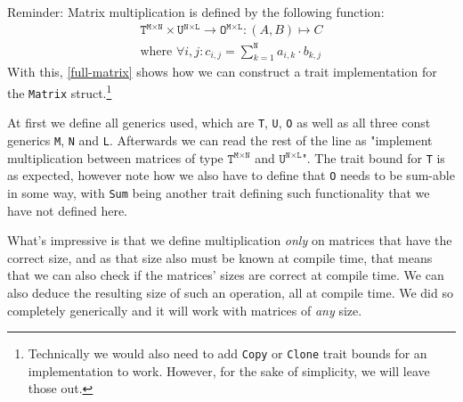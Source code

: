 Reminder: Matrix multiplication is defined by the following function:
\begin{align*}
\texttt{T}^{\texttt{M} \times \texttt{N}} \times \texttt{U}^{\texttt{N} \times \texttt{L}} \to \texttt{O}^{\texttt{M} \times \texttt{L}} : (A, B) \mapsto C \\
\text{where } \forall i, j: c_{i, j} = \sum_{k = 1}^{\texttt{N}} a_{i, k} \cdot b_{k, j}
\end{align*}
With this, \autoref{full-matrix} shows how we can construct a trait implementation for the \verb|Matrix| struct.\footnote{Technically we would also need to add \verb|Copy| or \verb|Clone| trait bounds for an implementation to work. However, for the sake of simplicity, we will leave those out.}

At first we define all generics used, which are \verb|T|, \verb|U|, \verb|O| as well as all three const generics \verb|M|, \verb|N| and \verb|L|.
Afterwards we can read the rest of the line as "implement multiplication between matrices of type $\texttt{T}^{\texttt{M} \times \texttt{N}}$ and $\texttt{U}^{\texttt{N} \times \texttt{L}}$". The trait bound for \verb|T| is as expected, however note how we also have to define that \verb|O| needs to be sum-able in some way, with \verb|Sum| being another trait defining such functionality that we have not defined here.

What's impressive is that we define multiplication \emph{only} on matrices that have the correct size, and as that size also must be known at compile time, that means that we can also check if the matrices' sizes are correct at compile time. We can also deduce the resulting size of such an operation, all at compile time. We did so completely generically and it will work with matrices of \emph{any} size.
